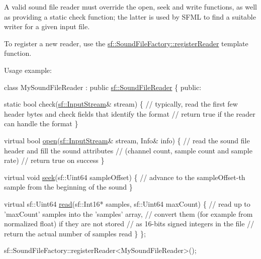 A valid sound file reader must override the open, seek and write functions, as well as providing a static check function; the latter is used by S\+F\+ML to find a suitable writer for a given input file.

To register a new reader, use the \hyperlink{classsf_1_1_sound_file_factory_acaf1f0bf1b7c7b9988ec76b33e33fe95}{sf\+::\+Sound\+File\+Factory\+::register\+Reader} template function.

Usage example\+: 
\begin{DoxyCode}
\textcolor{keyword}{class }MySoundFileReader : \textcolor{keyword}{public} \hyperlink{classsf_1_1_sound_file_reader}{sf::SoundFileReader}
\{
\textcolor{keyword}{public}:

    \textcolor{keyword}{static} \textcolor{keywordtype}{bool} check(\hyperlink{classsf_1_1_input_stream}{sf::InputStream}& stream)
    \{
        \textcolor{comment}{// typically, read the first few header bytes and check fields that identify the format}
        \textcolor{comment}{// return true if the reader can handle the format}
    \}

    \textcolor{keyword}{virtual} \textcolor{keywordtype}{bool} \hyperlink{classsf_1_1_sound_file_reader_aa1d2fee2ba8f359c833ab74590d55935}{open}(\hyperlink{classsf_1_1_input_stream}{sf::InputStream}& stream, Info& info)
    \{
        \textcolor{comment}{// read the sound file header and fill the sound attributes}
        \textcolor{comment}{// (channel count, sample count and sample rate)}
        \textcolor{comment}{// return true on success}
    \}

    \textcolor{keyword}{virtual} \textcolor{keywordtype}{void} \hyperlink{classsf_1_1_sound_file_reader_a1e18ade5ffe882bdfa20a2ebe7e2b015}{seek}(sf::Uint64 sampleOffset)
    \{
        \textcolor{comment}{// advance to the sampleOffset-th sample from the beginning of the sound}
    \}

    \textcolor{keyword}{virtual} sf::Uint64 \hyperlink{classsf_1_1_sound_file_reader_a3b7d86769ea07e24e7b0f0486bed7591}{read}(sf::Int16* samples, sf::Uint64 maxCount)
    \{
        \textcolor{comment}{// read up to 'maxCount' samples into the 'samples' array,}
        \textcolor{comment}{// convert them (for example from normalized float) if they are not stored}
        \textcolor{comment}{// as 16-bits signed integers in the file}
        \textcolor{comment}{// return the actual number of samples read}
    \}
\};

sf::SoundFileFactory::registerReader<MySoundFileReader>();
\end{DoxyCode}


